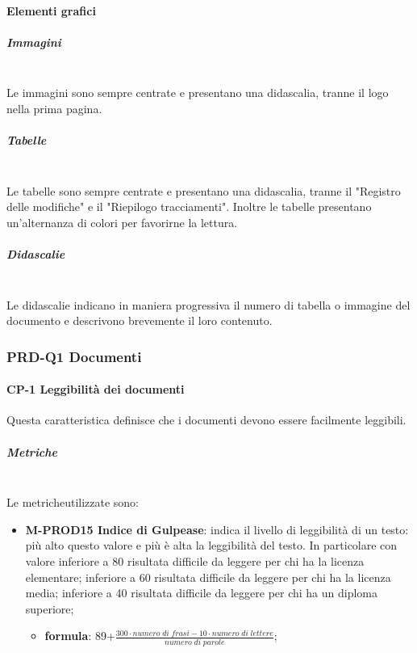             \paragraph{Elementi grafici}
                \subparagraph{Immagini}\mbox{}\\ [1mm]
                    Le immagini sono sempre centrate e presentano una didascalia, tranne il logo nella prima pagina.
                \subparagraph{Tabelle}\mbox{}\\ [1mm]
                    Le tabelle sono sempre centrate e presentano una didascalia, tranne il "Registro delle modifiche" e il "Riepilogo tracciamenti".
                    Inoltre le tabelle presentano un'alternanza di colori per favorirne la lettura.
                \subparagraph{Didascalie}\mbox{}\\ [1mm]
                    Le didascalie indicano in maniera progressiva il numero di tabella o immagine del documento e descrivono brevemente il loro contenuto.

       \subsubsection{PRD-Q1 Documenti}
        \paragraph{CP-1 Leggibilità dei documenti}
        Questa caratteristica definisce che i documenti devono essere facilmente leggibili.
        \subparagraph{Metriche}\mbox{}\\ [1mm]
        Le metriche\glosp utilizzate sono:   
        	  \begin{itemize}
	          	  	\item \textbf{M-PROD15 Indice di Gulpease}: indica il livello di leggibilità di un testo: più alto questo valore e più è alta la leggibilità del testo. In particolare con valore inferiore a 80 risultata difficile da leggere per chi ha la licenza elementare; inferiore a 60 risultata difficile da leggere per chi ha la licenza media; inferiore a 40 risultata difficile da leggere per chi ha un diploma superiore;
	          	  	\begin{itemize}
	          	  		\item[] \textbf{formula}: 89+$\frac{300\cdot numero \; di \; frasi-10\cdot numero \; di \; lettere}{numero \; di \; parole}$;
	          	  	\end{itemize}               
        	  \end{itemize}
      
